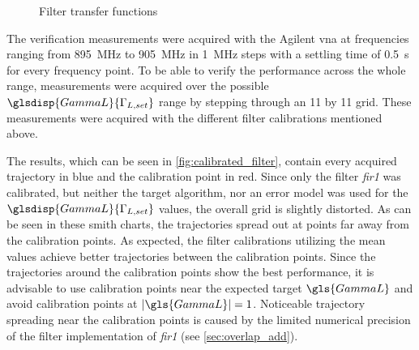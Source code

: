 \documentclass[12pt,a4paper,parskip=full,abstract=true,BCOR=12mm,twoside,open=right]{scrreprt}
\providecommand{\abs}[1]{\lvert#1\rvert}
\def\device#1{\textit{#1}}
\newcommand{\Angle}{\glsdisp{angle}{\angle}}
\begin{document}
\begin{figure}[htb]
    \centering
    \caption{Filter transfer functions}
    \label{fig:filter}
\end{figure}

The verification measurements were acquired with the Agilent \gls{vna} at frequencies
ranging from \SI{895}{\mega\hertz} to \SI{905}{\mega\hertz} in \SI{1}{\mega\hertz} steps
with a settling time of \SI{0.5}{\second} for every frequency point. To be able to verify %
the performance across the whole range, measurements were acquired over the possible
$\glsdisp{GammaL}{\Gamma_{L,set}}$ range by stepping through an 11 by 11 grid. These measurements were
acquired with the different filter calibrations mentioned above. %

The results, which can be seen in \cref{fig:calibrated_filter}, contain every acquired
trajectory in blue and the calibration point in red. Since only the filter \device{fir1}
was calibrated, but neither the target algorithm, nor an error model was used for the
$\glsdisp{GammaL}{\Gamma_{L,set}}$ values, the overall grid is slightly distorted. As can be seen in these
smith charts, the trajectories spread out at points far away from the calibration points.
As expected, the filter calibrations utilizing the mean values achieve better trajectories
between the calibration points. Since the trajectories around the calibration points
show the best performance, it is advisable to use calibration points near the expected
target $\gls{GammaL}$ and avoid calibration points at $\abs{\gls{GammaL}} = 1$. Noticeable
trajectory spreading near the calibration points is caused by the limited numerical
precision of the filter implementation of \device{fir1} (see \cref{sec:overlap_add}).
\end{document}
